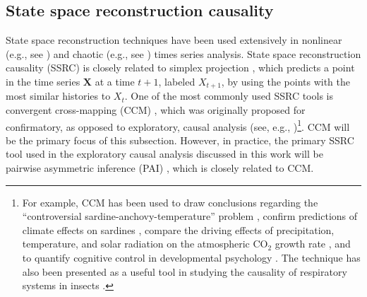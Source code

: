 \documentclass{article}[10pt]
\begin{document}
\subsection{State space reconstruction causality}
\label{sec:SSRC}
State space reconstruction techniques have been used extensively in nonlinear (e.g., see \cite{Deyle2011}) and chaotic (e.g., see \cite{Farmer1987}) times series analysis.  State space reconstruction causality (SSRC) is closely related to simplex projection \cite{Sugihara1990,Sugihara1990a}, which predicts a point in the time series $\mathbf{X}$ at a time $t+1$, labeled $X_{t+1}$, by using the points with the most similar histories to $X_t$.  One of the most commonly used SSRC tools is convergent cross-mapping (CCM) \cite{Sugihara2012}, which was originally proposed for confirmatory, as opposed to exploratory, causal analysis (see, e.g., \cite{Ye2014,Sugihara2012})\footnote{For example, CCM has been used to draw conclusions regarding the ``controversial sardine-anchovy-temperature'' problem \cite{Sugihara2012}, confirm predictions of climate effects on sardines \cite{Deyle2013}, compare the driving effects of precipitation, temperature, and solar radiation on the atmospheric CO$_2$ growth rate \cite{Wang2014}, and to quantify cognitive control in developmental psychology \cite{Anastas2013}.  The technique has also been presented as a useful tool in studying the causality of respiratory systems in insects \cite{Bozorgmagham2013}.}.  CCM will be the primary focus of this subsection.  However, in practice, the primary SSRC tool used in the exploratory causal analysis discussed in this work will be pairwise asymmetric inference (PAI) \cite{Weigel2014}, which is closely related to CCM.  
\end{document}
